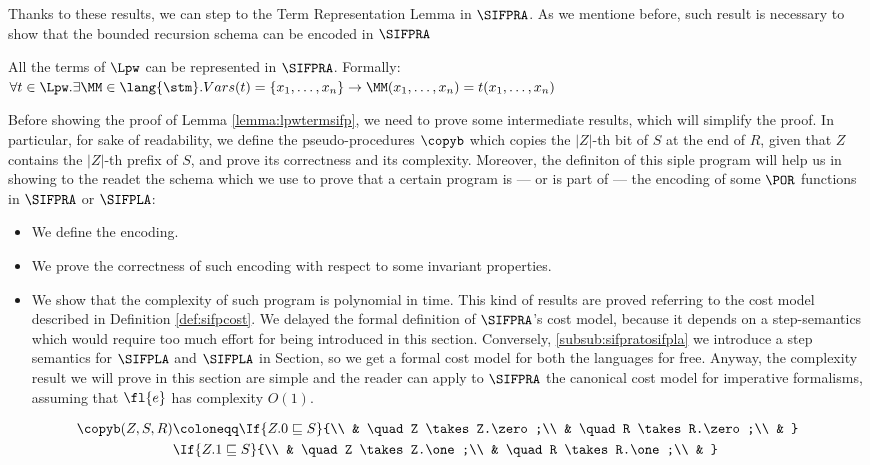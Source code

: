Thanks to these results, we can step to the Term Representation Lemma in $\SIFPRA$.
As we mentione before, such result is necessary to show that
the bounded recursion schema can be encoded in $\SIFPRA$


\begin{lemma}
  \label{lemma:lpwtermsifp}
All the terms of $\Lpw$ can be represented in $\SIFPRA$. Formally: $\forall t \in \Lpw. \exists \MM\in \lang{\stm}. Vars(t)=\{x_1, \ldots, x_n\} \to \MM(x_1, \ldots, x_n)= t(x_1, \ldots, x_n)$
\end{lemma}

Before showing the proof of Lemma \ref{lemma:lpwtermsifp}, we need to prove some
intermediate results, which will simplify the proof. In particular,
for sake of readability, we define the pseudo-procedures $\copyb$ which copies
the $|Z|$-th bit of $S$ at the end of $R$,
given that $Z$ contains the $|Z|$-th prefix of $S$, and prove its correctness
and its complexity.
%
Moreover, the definiton of this siple program will help us in showing
to the readet the schema which we use to prove that a certain program is
--- or is part of --- the encoding of some $\POR$ functions in
$\SIFPRA$ or $\SIFPLA$:

\begin{itemize}
  \item We define the encoding.
  \item We prove the correctness of such encoding with respect to some invariant
  properties.
  \item We show that the complexity of such program is polynomial in time.
  This kind of results are proved referring to the cost model described
  in Definition \ref{def:sifpcost}.
  We delayed the formal definition of $\SIFPRA$'s cost model,
  because it depends on a step-semantics which
  would require too much effort for being introduced in this section.
  Conversely,
  \ref{subsub:sifpratosifpla} we introduce a step semantics for
  $\SIFPLA$ and $\SIFPLA$ in Section, so we get a formal
  cost model for both the languages for free.
  Anyway, the complexity result we will prove in this section are
  simple and the reader can apply to $\SIFPRA$ the canonical cost model for
  imperative formalisms, assuming that $\fl{e}$ has complexity $O(1)$.
\end{itemize}

\begin{defn}
  \label{def:copyb}
  \begin{align*}
  \copyb (Z, S, R)&\coloneqq  \If{Z.0 \sqsubseteq S}{\\
  & \quad Z \takes Z.\zero;\\
  & \quad R \takes R.\zero;\\
  & }\\
  & \If{Z.1 \sqsubseteq S}{\\
  & \quad Z \takes Z.\one;\\
  & \quad R \takes R.\one;\\
  & }\\
  \end{align*}
\end{defn}

